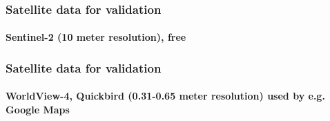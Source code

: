 \documentclass[color=usenames,dvipsnames]{beamer}
\begin{document}
\begin{frame}

\frametitle{Satellite data for validation}


\framesubtitle{Sentinel-2 (10 meter resolution), free}

\end{frame}

\begin{frame}
\frametitle{Satellite data for validation }
\framesubtitle{WorldView-4, Quickbird (0.31-0.65 meter resolution) used by e.g. Google Maps}


\end{frame}
\end{document}
